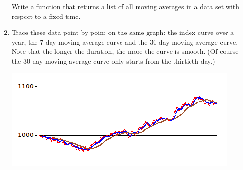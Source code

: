 \documentclass[11pt,class=report,crop=false]{standalone}
\begin{document}
\begin{activite}
\begin{enumerate}
   Write a function  that returns a list of all moving averages in a data set with respect to a fixed time.
   
    \item Trace these data point by point on the same graph: the index curve over a year, the $7$-day moving average curve and the $30$-day moving average curve. Note that the longer the duration, the more the curve is \og{}smooth\fg{}. (Of course the $30$-day moving average curve only starts from the thirtieth day.)
   
\begin{center}
\includegraphics[scale=\myscale,scale=0.8]{screen-stat-5b}
\end{center}

\end{enumerate}

\end{activite}
\end{document}
